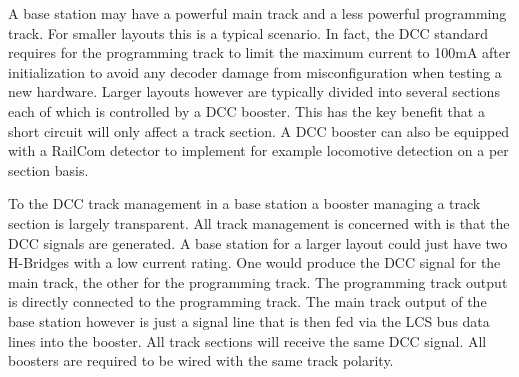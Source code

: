 A base station may have a powerful main track and a less powerful programming track. For smaller layouts this is a typical scenario. In fact, the DCC standard requires for the programming track to limit the maximum current to 100mA after initialization to avoid any decoder damage from misconfiguration when testing a new hardware. Larger layouts however are typically divided into several sections each of which is controlled by a DCC booster. This has the key benefit that a short circuit will only affect a track section. A DCC booster can also be equipped with a RailCom detector to implement for example locomotive detection on a per section basis.

To the DCC track management in a base station a booster managing a track section is largely transparent. All track management is concerned with is that the DCC signals are generated. A base station for a larger layout could just have two H-Bridges with a low current rating. One would produce the DCC signal for the main track, the other for the programming track. The programming track output is directly connected to the programming track. The main track output of the base station however is just a signal line that is then fed via the LCS bus data lines into the booster. All track sections will receive the same DCC signal. All boosters are required to be wired with the same track polarity.

